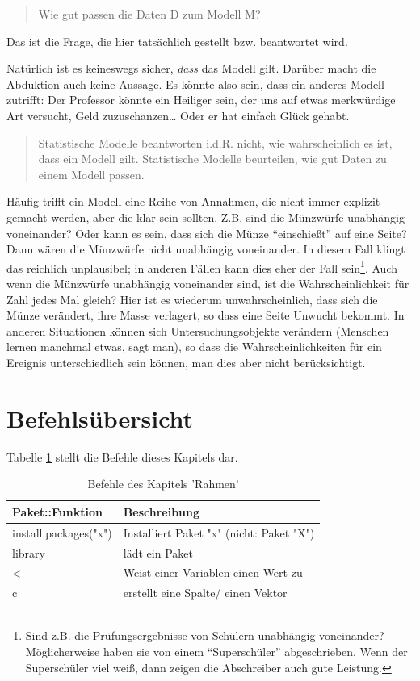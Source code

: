 \documentclass[12pt,ngerman,]{book}
\let\rmarkdownfootnote\footnote%
\def\footnote{\protect\rmarkdownfootnote}
\theoremstyle{definition}
\theoremstyle{definition}
\theoremstyle{remark}
\begin{document}
\begin{quote}
Wie gut passen die Daten D zum Modell M?
\end{quote}

Das ist die Frage, die hier tatsächlich gestellt bzw. beantwortet wird.

Natürlich ist es keineswegs sicher, \emph{dass} das Modell gilt. Darüber
macht die Abduktion auch keine Aussage. Es könnte also sein, dass ein
anderes Modell zutrifft: Der Professor könnte ein Heiliger sein, der uns
auf etwas merkwürdige Art versucht, Geld zuzuschanzen\ldots{} Oder er
hat einfach Glück gehabt.

\begin{quote}
Statistische Modelle beantworten i.d.R. nicht, wie wahrscheinlich es
ist, dass ein Modell gilt. Statistische Modelle beurteilen, wie gut
Daten zu einem Modell passen.
\end{quote}

Häufig trifft ein Modell eine Reihe von Annahmen, die nicht immer
explizit gemacht werden, aber die klar sein sollten. Z.B. sind die
Münzwürfe unabhängig voneinander? Oder kann es sein, dass sich die Münze
``einschießt'' auf eine Seite? Dann wären die Münzwürfe nicht unabhängig
voneinander. In diesem Fall klingt das reichlich unplausibel; in anderen
Fällen kann dies eher der Fall sein\footnote{Sind z.B. die
  Prüfungsergebnisse von Schülern unabhängig voneinander? Möglicherweise
  haben sie von einem ``Superschüler'' abgeschrieben. Wenn der
  Superschüler viel weiß, dann zeigen die Abschreiber auch gute
  Leistung.}. Auch wenn die Münzwürfe unabhängig voneinander sind, ist
die Wahrscheinlichkeit für Zahl jedes Mal gleich? Hier ist es wiederum
unwahrscheinlich, dass sich die Münze verändert, ihre Masse verlagert,
so dass eine Seite Unwucht bekommt. In anderen Situationen können sich
Untersuchungsobjekte verändern (Menschen lernen manchmal etwas, sagt
man), so dass die Wahrscheinlichkeiten für ein Ereignis unterschiedlich
sein können, man dies aber nicht berücksichtigt.

\section{Befehlsübersicht}\label{befehlsubersicht}

Tabelle \ref{tab:befehle-rahmen} stellt die Befehle dieses Kapitels dar.

\begin{table}

\caption{\label{tab:befehle-rahmen}Befehle des Kapitels 'Rahmen'}
\centering
\begin{tabular}[t]{l|l}
\hline
Paket::Funktion & Beschreibung\\
\hline
install.packages("x") & Installiert Paket "x" (nicht: Paket "X")\\
\hline
library & lädt ein Paket\\
\hline
<- & Weist einer Variablen einen Wert zu\\
\hline
c & erstellt eine Spalte/ einen Vektor\\
\hline
\end{tabular}
\end{table}
\end{document}
